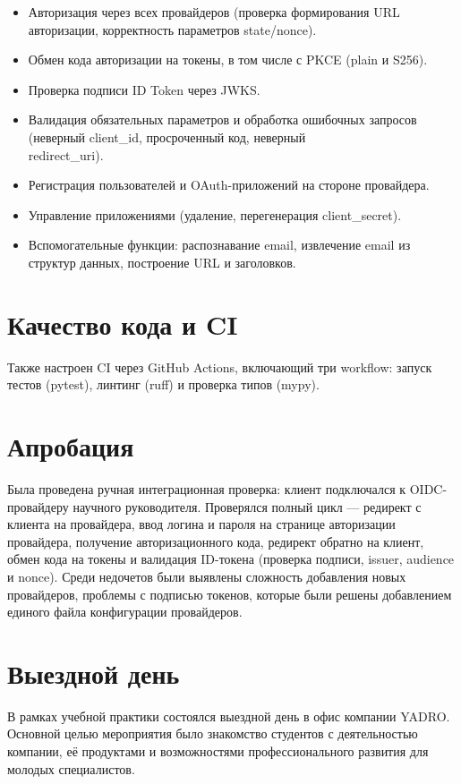 \documentclass[a4paper]{article}
\begin{document}
\begin{itemize}
    \item Авторизация через всех провайдеров (проверка формирования URL авторизации, корректность параметров state/nonce).
    \item Обмен кода авторизации на токены, в том числе с PKCE (plain и S256).
    \item Проверка подписи ID Token через JWKS.
    \item Валидация обязательных параметров и обработка ошибочных запросов (неверный client\_id, просроченный код, неверный \\redirect\_uri).
    \item Регистрация пользователей и OAuth-приложений на стороне провайдера.
    \item Управление приложениями (удаление, перегенерация client\_secret).
    \item Вспомогательные функции: распознавание email, извлечение email из структур данных, построение URL и заголовков.
\end{itemize} 

\section{Качество кода и CI}

Также настроен CI через GitHub Actions, включающий три workflow: запуск тестов (pytest), линтинг (ruff) и проверка типов (mypy).

\section{Апробация}

Была проведена ручная интеграционная проверка: клиент подключался к OIDC-провайдеру научного руководителя. Проверялся полный цикл --- редирект с клиента на провайдера, ввод логина и пароля на странице авторизации провайдера, получение авторизационного кода, редирект обратно на клиент, обмен кода на токены и валидация ID-токена (проверка подписи, issuer, audience и nonce). Среди недочетов были выявлены сложность добавления новых провайдеров, проблемы с подписью токенов, которые были решены добавлением единого файла конфигурации провайдеров. 

\section{Выездной день}
В рамках учебной практики состоялся выездной день в офис компании YADRO. Основной целью мероприятия было знакомство студентов с деятельностью компании, её продуктами и возможностями профессионального развития для молодых специалистов.
\end{document}

